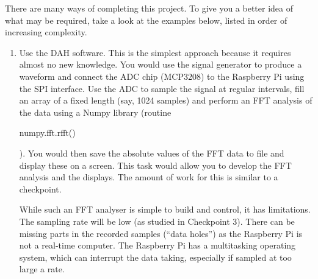 There are many ways of completing this project.
To give you a better idea of what may be required, take a look at the examples below, listed in order of increasing complexity. 

\begin{enumerate}
\item	Use the DAH software.
This is the simplest approach because it requires almost no new knowledge.
You would use the signal generator to produce a waveform and connect the ADC chip (MCP3208) to the Raspberry Pi using the SPI interface.
Use the ADC to sample the signal at regular intervals, fill an array of a fixed length (say, 1024 samples) and perform an FFT analysis of the data using a Numpy library (routine \begin{tt}numpy.fft.rfft()\end{tt}).
You would then save the absolute values of the FFT data to file and display these on a screen.
This task would allow you to develop the FFT analysis and the displays.
The amount of work for this is similar to a checkpoint.

While such an FFT analyser is simple to build and control, it has limitations.
The sampling rate will be low (as studied in Checkpoint 3).
There can be missing parts in the recorded samples (``data holes'') as the Raspberry Pi is not a real-time computer.
The Raspberry Pi has a multitasking operating system, which can interrupt the data taking, especially if sampled at too large a rate.


\end{enumerate}
